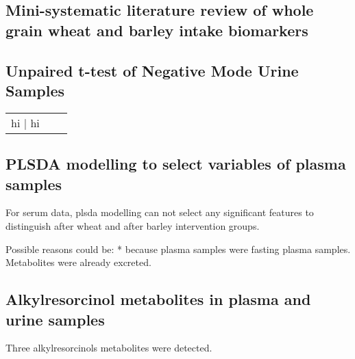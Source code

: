 \subsection{Mini-systematic literature review of whole grain wheat and barley intake biomarkers}



\subsection{Unpaired t-test of Negative Mode Urine Samples}
\begin{tabular}{c|c|c}
	hi | hi
\end{tabular}

\subsection{PLSDA modelling to select variables of plasma samples}
For serum data, plsda modelling can not select any significant features to distinguish after wheat and after barley intervention groups.

Possible reasons could be:
* because plasma samples were fasting plasma samples. Metabolites were already excreted.

\subsection{Alkylresorcinol metabolites in plasma and urine samples}
Three alkylresorcinols metabolites were detected. 